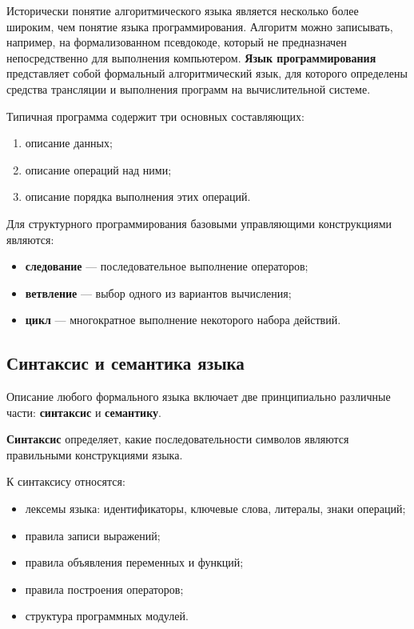 Исторически понятие алгоритмического языка является несколько более широким, чем понятие языка программирования. Алгоритм можно записывать, например, на формализованном псевдокоде, который не предназначен непосредственно для выполнения компьютером. \textbf{Язык программирования} представляет собой формальный алгоритмический язык, для которого определены средства трансляции и выполнения программ на вычислительной системе.

Типичная программа содержит три основных составляющих:
\begin{enumerate}
	\item описание данных;
	\item описание операций над ними;
	\item описание порядка выполнения этих операций.
\end{enumerate}

Для структурного программирования базовыми управляющими конструкциями являются:
\begin{itemize}
	\item \textbf{следование} --- последовательное выполнение операторов;
	\item \textbf{ветвление} --- выбор одного из вариантов вычисления;
	\item \textbf{цикл} --- многократное выполнение некоторого набора действий.
\end{itemize}


\subsection{Синтаксис и семантика языка}

Описание любого формального языка включает две принципиально различные части: \textbf{синтаксис} и \textbf{семантику}.

\textbf{Синтаксис} определяет, какие последовательности символов являются правильными конструкциями языка.

К синтаксису относятся:
\begin{itemize}
	\item лексемы языка: идентификаторы, ключевые слова, литералы, знаки операций;
	\item правила записи выражений;
	\item правила объявления переменных и функций;
	\item правила построения операторов;
	\item структура программных модулей.
\end{itemize}

